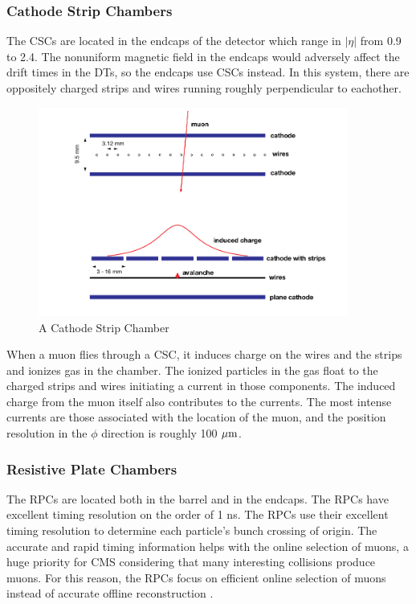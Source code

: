 \FloatBarrier
\subsubsection{Cathode Strip Chambers}

The CSCs are located in the endcaps of the detector which range in $|\eta|$ from 0.9 to 2.4. The nonuniform magnetic field in the endcaps would adversely affect the drift times in the DTs, so the endcaps use CSCs instead. In this system, there are oppositely charged strips and wires running roughly perpendicular to eachother.

\begin{figure}[h!]
  \centering
  \includegraphics[width=4in]{images/CSC.png}
  \caption
   {A Cathode Strip Chamber \cite{mutdr}}
  \label{fig:csc}
\end{figure}
When a muon flies through a CSC, it induces charge on the wires and the strips and ionizes gas in the chamber. The ionized particles in the gas float to the charged strips and wires initiating a current in those components. The induced charge from the muon itself also contributes to the currents. The most intense currents are those associated with the location of the muon, and the position resolution in the $\phi$ direction is roughly 100 ${\rm \mu m}$.

\FloatBarrier
\subsubsection{Resistive Plate Chambers}

The RPCs are located both in the barrel and in the endcaps. The RPCs have excellent timing resolution on the order of 1 ns. The RPCs use their excellent timing resolution to determine each particle's bunch crossing of origin. The accurate and rapid timing information helps with the online selection of muons, a huge priority for CMS considering that many interesting collisions produce muons. For this reason, the RPCs focus on efficient online selection of muons instead of accurate offline reconstruction \cite{cmsexp}.

